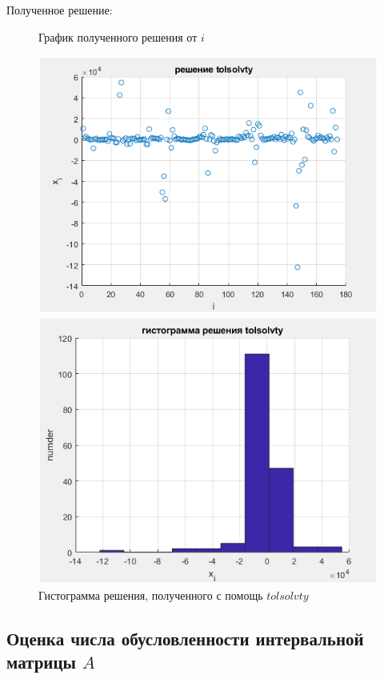\documentclass[a4]{article}
\begin{document}
Полученное решение:

\begin{figure}[H]
\begin{center}
\caption{График полученного решения от $i$}
\includegraphics{pic4.png} 

\caption{Гистограмма решения, полученного с помощь $tolsolvty$}
\includegraphics{pic5.png} 
\end{center}
\end{figure}

\subsection{Оценка числа обусловленности интервальной матрицы $A$}
\end{document}
